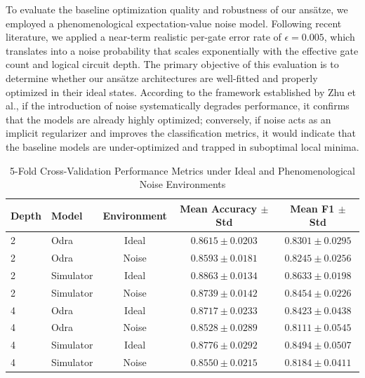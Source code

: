 \documentclass[11pt]{article}
\begin{document}
To evaluate the baseline optimization quality and robustness of our ans\"atze, we employed a phenomenological expectation-value noise model. Following recent literature, we applied a near-term realistic per-gate error rate of $\epsilon = 0.005$, which translates into a noise probability that scales exponentially with the effective gate count and logical circuit depth. The primary objective of this evaluation is to determine whether our ans\"atze architectures are well-fitted and properly optimized in their ideal states. According to the framework established by Zhu et al., if the introduction of noise systematically degrades performance, it confirms that the models are already highly optimized; conversely, if noise acts as an implicit regularizer and improves the classification metrics, it would indicate that the baseline models are under-optimized and trapped in suboptimal local minima.

\begin{table}[htbp]
    \centering
    \caption{5-Fold Cross-Validation Performance Metrics under Ideal and Phenomenological Noise Environments}
    \label{tab:noise_cv}
    \renewcommand{\arraystretch}{1.2}
    \begin{tabular}{llccc}
        \hline
        \textbf{Depth} & \textbf{Model} & \textbf{Environment} & \textbf{Mean Accuracy $\pm$ Std} & \textbf{Mean F1 $\pm$ Std} \\ \hline
        2 & Odra & Ideal & $0.8615 \pm 0.0203$ & $0.8301 \pm 0.0295$ \\
        2 & Odra & Noise & $0.8593 \pm 0.0181$ & $0.8245 \pm 0.0256$ \\
        2 & Simulator & Ideal & $0.8863 \pm 0.0134$ & $0.8633 \pm 0.0198$ \\
        2 & Simulator & Noise & $0.8739 \pm 0.0142$ & $0.8454 \pm 0.0226$ \\ \hline
        4 & Odra & Ideal & $0.8717 \pm 0.0233$ & $0.8423 \pm 0.0438$ \\
        4 & Odra & Noise & $0.8528 \pm 0.0289$ & $0.8111 \pm 0.0545$ \\
        4 & Simulator & Ideal & $0.8776 \pm 0.0292$ & $0.8494 \pm 0.0507$ \\
        4 & Simulator & Noise & $0.8550 \pm 0.0215$ & $0.8184 \pm 0.0411$ \\ \hline
    \end{tabular}
\end{table}
\end{document}
